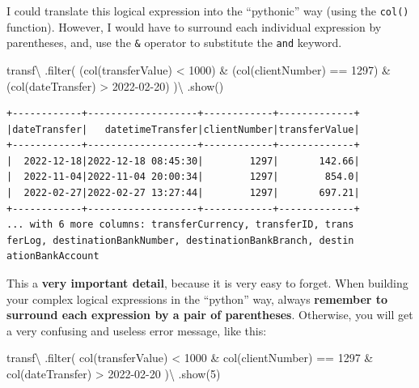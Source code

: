 \documentclass[
  11pt,
  letterpaper,
  DIV=11,
  numbers=noendperiod]{scrreprt}
\newenvironment{Shaded}{\begin{snugshade}}{\end{snugshade}}
\newcommand{\BuiltInTok}[1]{\textcolor[rgb]{0.00,0.23,0.31}{#1}}
\newcommand{\DecValTok}[1]{\textcolor[rgb]{0.68,0.00,0.00}{#1}}
\newcommand{\NormalTok}[1]{\textcolor[rgb]{0.00,0.23,0.31}{#1}}
\newcommand{\OperatorTok}[1]{\textcolor[rgb]{0.37,0.37,0.37}{#1}}
\newcommand{\StringTok}[1]{\textcolor[rgb]{0.13,0.47,0.30}{#1}}
\begin{document}
I could translate this logical expression into the ``pythonic'' way
(using the \texttt{col()} function). However, I would have to surround
each individual expression by parentheses, and, use the \texttt{\&}
operator to substitute the \texttt{and} keyword.

\begin{Shaded}
\begin{Highlighting}[]
\NormalTok{transf}\OperatorTok{\textbackslash{}}
\NormalTok{  .}\BuiltInTok{filter}\NormalTok{(}
\NormalTok{    (col(}\StringTok{\textquotesingle{}transferValue\textquotesingle{}}\NormalTok{) }\OperatorTok{\textless{}} \DecValTok{1000}\NormalTok{) }\OperatorTok{\&}
\NormalTok{    (col(}\StringTok{\textquotesingle{}clientNumber\textquotesingle{}}\NormalTok{) }\OperatorTok{==} \DecValTok{1297}\NormalTok{) }\OperatorTok{\&}
\NormalTok{    (col(}\StringTok{\textquotesingle{}dateTransfer\textquotesingle{}}\NormalTok{) }\OperatorTok{\textgreater{}} \StringTok{\textquotesingle{}2022{-}02{-}20\textquotesingle{}}\NormalTok{)}
\NormalTok{  )}\OperatorTok{\textbackslash{}}
\NormalTok{  .show()}
\end{Highlighting}
\end{Shaded}

\begin{verbatim}
+------------+-------------------+------------+-------------+
|dateTransfer|   datetimeTransfer|clientNumber|transferValue|
+------------+-------------------+------------+-------------+
|  2022-12-18|2022-12-18 08:45:30|        1297|       142.66|
|  2022-11-04|2022-11-04 20:00:34|        1297|        854.0|
|  2022-02-27|2022-02-27 13:27:44|        1297|       697.21|
+------------+-------------------+------------+-------------+
... with 6 more columns: transferCurrency, transferID, trans
ferLog, destinationBankNumber, destinationBankBranch, destin
ationBankAccount
\end{verbatim}

This a \textbf{very important detail}, because it is very easy to
forget. When building your complex logical expressions in the ``python''
way, always \textbf{remember to surround each expression by a pair of
parentheses}. Otherwise, you will get a very confusing and useless error
message, like this:

\begin{Shaded}
\begin{Highlighting}[]
\NormalTok{transf}\OperatorTok{\textbackslash{}}
\NormalTok{  .}\BuiltInTok{filter}\NormalTok{(}
\NormalTok{    col(}\StringTok{\textquotesingle{}transferValue\textquotesingle{}}\NormalTok{) }\OperatorTok{\textless{}} \DecValTok{1000} \OperatorTok{\&}
\NormalTok{    col(}\StringTok{\textquotesingle{}clientNumber\textquotesingle{}}\NormalTok{) }\OperatorTok{==} \DecValTok{1297} \OperatorTok{\&}
\NormalTok{    col(}\StringTok{\textquotesingle{}dateTransfer\textquotesingle{}}\NormalTok{) }\OperatorTok{\textgreater{}} \StringTok{\textquotesingle{}2022{-}02{-}20\textquotesingle{}}
\NormalTok{  )}\OperatorTok{\textbackslash{}}
\NormalTok{  .show(}\DecValTok{5}\NormalTok{)}
\end{Highlighting}
\end{Shaded}
\end{document}
